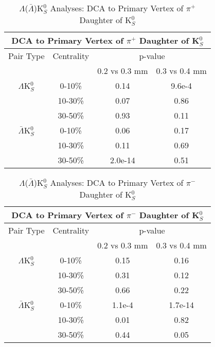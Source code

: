 \documentclass[../AnalysisNoteJBuxton.tex]{subfiles}
\begin{document}
\begin{table}
 \centering
 \begin{tabular}{|c|c|c|c|}
 \multicolumn{4}{c}{DCA to Primary Vertex of $\pi^{+}$ Daughter of K$^{0}_{S}$} \\
  \hline
  Pair Type & Centrality & \multicolumn{2}{c|}{p-value} \\
  \cline{3-4}
   & & 0.2 vs 0.3 mm & 0.3 vs 0.4 mm \\
  \hline
  $\Lambda$K$^{0}_{S}$ & 0-10\% & 0.14 & 9.6e-4 \\
   & 10-30\% & 0.07 & 0.86 \\
   & 30-50\% & 0.93 & 0.11 \\
  \hline
  $\bar{\Lambda}$K$^{0}_{S}$ & 0-10\% & 0.06 & 0.17 \\
   & 10-30\% & 0.11 & 0.69 \\
   & 30-50\% & 2.0e-14 & 0.51 \\
  \hline
 \end{tabular}
 \caption{$\Lambda$($\bar{\Lambda}$)K$^{0}_{S}$ Analyses: DCA to Primary Vertex of $\pi^{+}$ Daughter of K$^{0}_{S}$}
 \label{tab:DcaToPrimVertexPosPionDaughtOfK0LamK0}
\end{table}

\begin{table}
 \centering
 \begin{tabular}{|c|c|c|c|}
 \multicolumn{4}{c}{DCA to Primary Vertex of $\pi^{-}$ Daughter of K$^{0}_{S}$} \\
  \hline
  Pair Type & Centrality & \multicolumn{2}{c|}{p-value} \\
  \cline{3-4}
   & & 0.2 vs 0.3 mm & 0.3 vs 0.4 mm \\
  \hline
  $\Lambda$K$^{0}_{S}$ & 0-10\% & 0.15 & 0.16 \\
   & 10-30\% & 0.31 & 0.12 \\
   & 30-50\% & 0.66 & 0.22 \\
  \hline
  $\bar{\Lambda}$K$^{0}_{S}$ & 0-10\% & 1.1e-4 & 1.7e-14 \\
   & 10-30\% & 0.01 & 0.82 \\
   & 30-50\% & 0.44 & 0.05 \\
  \hline
 \end{tabular}
 \caption{$\Lambda$($\bar{\Lambda}$)K$^{0}_{S}$ Analyses: DCA to Primary Vertex of $\pi^{-}$ Daughter of K$^{0}_{S}$}
 \label{tab:DcaToPrimVertexNegPionDaughtOfK0LamK0}
\end{table}
\end{document}
